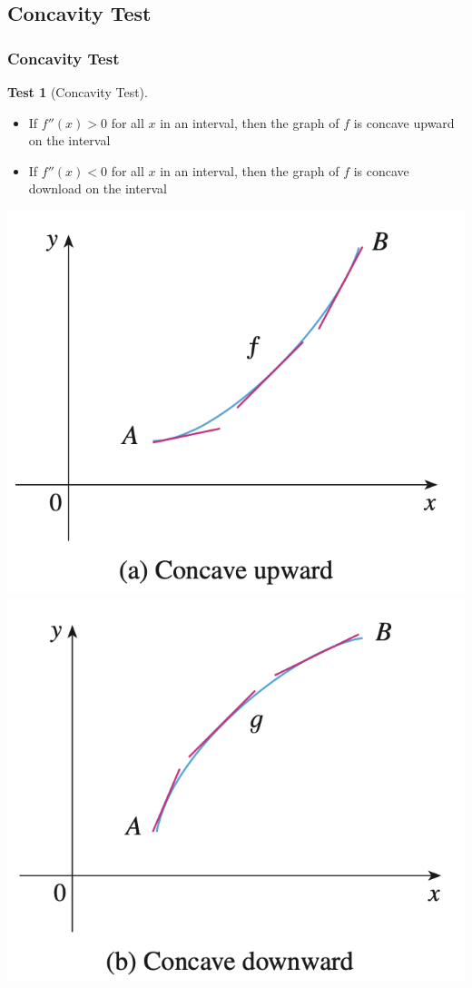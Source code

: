 \documentclass[t]{beamer}
\theoremstyle{plain}
\theoremstyle{definition}
\newtheorem{test}{Test}
\begin{document}
\subsection{Concavity Test}
\begin{frame}
\frametitle{Concavity Test}
\footnotesize
\begin{test}[Concavity Test]
	\begin{itemize}
		\item If $f''(x) > 0$ for all $x$ in an interval, then the graph of $f$ is concave upward on the interval
		\item If $f''(x) < 0$ for all $x$ in an interval, then the graph of $f$ is concave download on the interval
	\end{itemize}
\end{test}

\vspace{1em}
\centering
\includegraphics[scale=0.32]{fig/concave1}\includegraphics[scale=0.32]{fig/concave2}

\end{frame}
\end{document}
